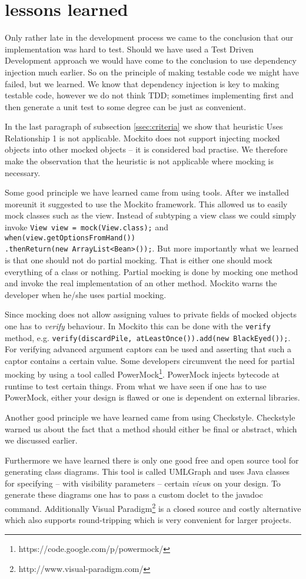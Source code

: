 \section{lessons learned}
Only rather late in the development process we came to the conclusion that our implementation was hard to test. Should we have used a Test
Driven Development approach we would have come to the conclusion to use dependency injection much earlier. So on the principle of making
testable code we might have failed, but we learned. We know that dependency injection is key to making testable code, however we do not
think TDD; sometimes implementing first and then generate a unit test to some degree can be just as convenient.

In the last paragraph of subsection \ref{ssec:criteria} we show that heuristic Uses Relationship 1 is not applicable. Mockito does not
support injecting mocked objects into other mocked objects -- it is considered bad practise. We therefore make the observation that the
heuristic is not applicable where mocking is necessary.

Some good principle we have learned came from using tools. After we installed moreunit it suggested to use the Mockito framework. This
allowed us to easily mock classes such as the view. Instead of subtyping a view class we could simply invoke \texttt{View view =
mock(View.class);} and \texttt{when(view.getOptionsFromHand())} \\ \texttt{.thenReturn(new ArrayList<Bean>());}. But more importantly what
we learned is that one should not do partial mocking. That is either one should mock everything of a class or nothing. Partial mocking is
done by mocking one method and invoke the real implementation of an other method. Mockito warns the developer when he/she uses partial
mocking.

Since mocking does not allow assigning values to private fields of mocked objects one has to \emph{verify} behaviour. In Mockito
this can be done with the \texttt{verify} method, e.g. \texttt{verify(discardPile, atLeastOnce()).add(new BlackEyed());}. For verifying
advanced argument captors can be used and asserting that such a captor contains a certain value. Some developers circumvent the need for
partial mocking by using a tool called PowerMock\footnote{https://code.google.com/p/powermock/}. PowerMock injects bytecode at runtime to
test certain things. From what we have seen if one has to use PowerMock, either your design is flawed or one is dependent on external
libraries.

Another good principle we have learned came from using Checkstyle. Checkstyle warned us about the fact that a method should either be final
or abstract, which we discussed earlier.

Furthermore we have learned there is only one good free and open source tool for generating class diagrams. This tool is called UMLGraph and
uses Java classes for specifying -- with visibility parameters -- certain \emph{view}s on your design. To generate these diagrams one has to
pass a custom doclet to the javadoc command. Additionally Visual Paradigm\footnote{http://www.visual-paradigm.com/} is a closed source and
costly alternative which also supports round-tripping which is very convenient for larger projects.
